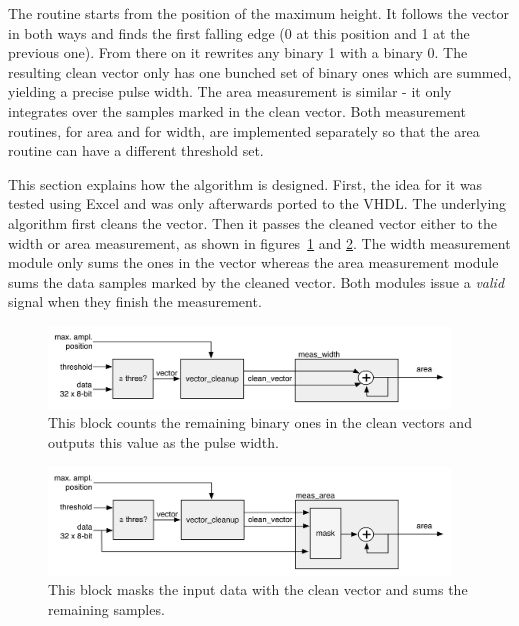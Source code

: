 The routine starts from the position of the maximum height. It follows the vector in both ways and finds the first falling edge (0 at this position and 1 at the previous one). From there on it rewrites any binary 1 with a binary 0. The resulting clean vector only has one bunched set of binary ones which are summed, yielding a precise pulse width. The area measurement is similar - it only integrates over the samples marked in the clean vector. Both measurement routines, for area and for width, are implemented separately so that the area routine can have a different threshold set.

This section explains how the algorithm is designed. First, the idea for it was tested using Excel and was only afterwards ported to the VHDL. The underlying algorithm first cleans the vector. Then it passes the cleaned vector either to the width or area measurement, as shown in figures~\ref{fig:width} and \ref{fig:area}. The width measurement module only sums the ones in the vector whereas the area measurement module sums the data samples marked by the cleaned vector. Both modules issue a \emph{valid} signal when they finish the measurement.

\begin{figure}[!t]
\centering
\includegraphics[width=0.95\textwidth]{05_current_monitoring/plots/width2}
\caption{This block counts the remaining binary ones in the clean vectors and outputs this value as the pulse width.}
\label{fig:width}
\end{figure}


\begin{figure}[!t]
\centering\includegraphics[width=0.95\textwidth]{05_current_monitoring/plots/area2}
\caption{This block masks the input data with the clean vector and sums the remaining samples.}
\label{fig:area}
\end{figure}


